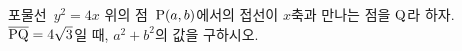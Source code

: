 포물선~$y^2=4x$ 위의 점~$\mathrm{P}(a{,}\mkern3mu\mathopen{}b)$에서의 접선이 $x$축과 만나는 점을 $\mathrm{Q}$라 하자. $\overline{\mathrm{PQ}}=4\sqrt{3}$일 때, $a^2+b^2$의 값을 구하시오.
